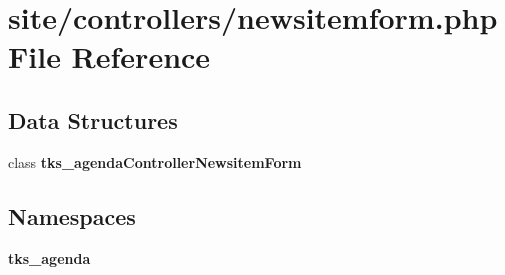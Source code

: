 \section{site/controllers/newsitemform.php File Reference}
\label{controllers_2newsitemform_8php}
\subsection*{Data Structures}
\begin{DoxyCompactItemize}
\item 
class \textbf{ tks\+\_\+agenda\+Controller\+Newsitem\+Form}
\end{DoxyCompactItemize}
\subsection*{Namespaces}
\begin{DoxyCompactItemize}
\item 
 \textbf{ tks\+\_\+agenda}
\end{DoxyCompactItemize}
